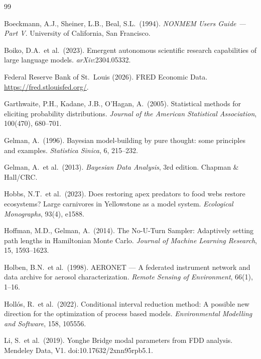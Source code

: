 \documentclass[11pt,a4paper]{article}
\begin{document}
\begin{thebibliography}{99}

Boeckmann, A.J., Sheiner, L.B., Beal, S.L.\ (1994).
\textit{NONMEM Users Guide --- Part V}.
University of California, San Francisco.

Boiko, D.A.\ et al.\ (2023).
Emergent autonomous scientific research capabilities of large language models.
\textit{arXiv}:2304.05332.

Federal Reserve Bank of St.\ Louis (2026).
FRED Economic Data.
\url{https://fred.stlouisfed.org/}.

Garthwaite, P.H., Kadane, J.B., O'Hagan, A.\ (2005).
Statistical methods for eliciting probability distributions.
\textit{Journal of the American Statistical Association}, 100(470), 680--701.

Gelman, A.\ (1996).
Bayesian model-building by pure thought: some principles and examples.
\textit{Statistica Sinica}, 6, 215--232.

Gelman, A.\ et al.\ (2013).
\textit{Bayesian Data Analysis}, 3rd edition.
Chapman \& Hall/CRC.

Hobbs, N.T.\ et al.\ (2023).
Does restoring apex predators to food webs restore ecosystems? Large carnivores in
Yellowstone as a model system.
\textit{Ecological Monographs}, 93(4), e1588.

Hoffman, M.D., Gelman, A.\ (2014).
The No-U-Turn Sampler: Adaptively setting path lengths in Hamiltonian Monte Carlo.
\textit{Journal of Machine Learning Research}, 15, 1593--1623.

Holben, B.N.\ et al.\ (1998).
AERONET --- A federated instrument network and data archive for aerosol characterization.
\textit{Remote Sensing of Environment}, 66(1), 1--16.

Hollós, R.\ et al.\ (2022).
Conditional interval reduction method: A possible new direction for the optimization of
process based models.
\textit{Environmental Modelling and Software}, 158, 105556.

Li, S.\ et al.\ (2019).
Yonghe Bridge modal parameters from FDD analysis.
Mendeley Data, V1. doi:10.17632/2xnn95rpb5.1.


\end{thebibliography}
\end{document}
